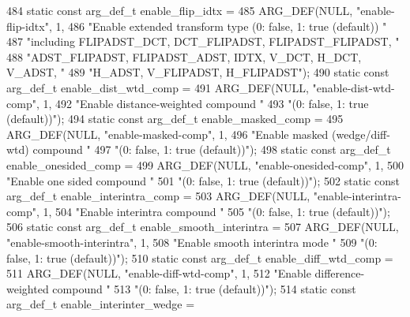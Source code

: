 \begin{DoxyCodeInclude}
{{{{{{{484 \textcolor{keyword}{static} \textcolor{keyword}{const} arg\_def\_t enable\_flip\_idtx =
485     ARG\_DEF(NULL, \textcolor{stringliteral}{"enable-flip-idtx"}, 1,
486             \textcolor{stringliteral}{"Enable extended transform type (0: false, 1: true (default)) "}
487             \textcolor{stringliteral}{"including FLIPADST\_DCT, DCT\_FLIPADST, FLIPADST\_FLIPADST, "}
488             \textcolor{stringliteral}{"ADST\_FLIPADST, FLIPADST\_ADST, IDTX, V\_DCT, H\_DCT, V\_ADST, "}
489             \textcolor{stringliteral}{"H\_ADST, V\_FLIPADST, H\_FLIPADST"});
490 \textcolor{keyword}{static} \textcolor{keyword}{const} arg\_def\_t enable\_dist\_wtd\_comp =
491     ARG\_DEF(NULL, \textcolor{stringliteral}{"enable-dist-wtd-comp"}, 1,
492             \textcolor{stringliteral}{"Enable distance-weighted compound "}
493             \textcolor{stringliteral}{"(0: false, 1: true (default))"});
494 \textcolor{keyword}{static} \textcolor{keyword}{const} arg\_def\_t enable\_masked\_comp =
495     ARG\_DEF(NULL, \textcolor{stringliteral}{"enable-masked-comp"}, 1,
496             \textcolor{stringliteral}{"Enable masked (wedge/diff-wtd) compound "}
497             \textcolor{stringliteral}{"(0: false, 1: true (default))"});
498 \textcolor{keyword}{static} \textcolor{keyword}{const} arg\_def\_t enable\_onesided\_comp =
499     ARG\_DEF(NULL, \textcolor{stringliteral}{"enable-onesided-comp"}, 1,
500             \textcolor{stringliteral}{"Enable one sided compound "}
501             \textcolor{stringliteral}{"(0: false, 1: true (default))"});
502 \textcolor{keyword}{static} \textcolor{keyword}{const} arg\_def\_t enable\_interintra\_comp =
503     ARG\_DEF(NULL, \textcolor{stringliteral}{"enable-interintra-comp"}, 1,
504             \textcolor{stringliteral}{"Enable interintra compound "}
505             \textcolor{stringliteral}{"(0: false, 1: true (default))"});
506 \textcolor{keyword}{static} \textcolor{keyword}{const} arg\_def\_t enable\_smooth\_interintra =
507     ARG\_DEF(NULL, \textcolor{stringliteral}{"enable-smooth-interintra"}, 1,
508             \textcolor{stringliteral}{"Enable smooth interintra mode "}
509             \textcolor{stringliteral}{"(0: false, 1: true (default))"});
510 \textcolor{keyword}{static} \textcolor{keyword}{const} arg\_def\_t enable\_diff\_wtd\_comp =
511     ARG\_DEF(NULL, \textcolor{stringliteral}{"enable-diff-wtd-comp"}, 1,
512             \textcolor{stringliteral}{"Enable difference-weighted compound "}
513             \textcolor{stringliteral}{"(0: false, 1: true (default))"});
514 \textcolor{keyword}{static} \textcolor{keyword}{const} arg\_def\_t enable\_interinter\_wedge =
}}}}}}}
\end{DoxyCodeInclude}
